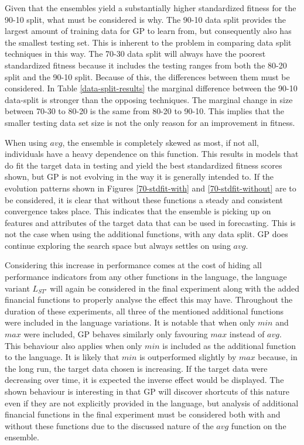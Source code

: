 \documentclass[12pt, letterpaper]{article}
\begin{document}
\textrm{ \indent Given that the ensembles yield a substantially higher standardized fitness for the 90-10 split, what must be considered is why. The 90-10 data split provides the largest amount of training data for GP to learn from, but consequently also has the smallest testing set. This is inherent to the problem in comparing data split techniques in this way. The 70-30 data split will always have the poorest standardized fitness because it includes the testing ranges from both the 80-20 split and the 90-10 split. Because of this, the differences between them must be considered. In Table \ref{data-split-results} the marginal difference between the 90-10 data-split is stronger than the opposing techniques. The marginal change in size between 70-30 to 80-20 is the same from 80-20 to 90-10. This implies that the smaller testing data set size is not the only reason for an improvement in fitness. }

\textrm{ \indent When using $avg$, the ensemble is completely skewed as most, if not all, individuals have a heavy dependence on this function. This results in models that do fit the target data in testing and yield the best standardized fitness scores shown, but GP is not evolving in the way it is generally intended to. If the evolution patterns shown in Figures \ref{70-stdfit-with} and \ref{70-stdfit-without} are to be considered, it is clear that without these functions a steady and consistent convergence takes place. This indicates that the ensemble is picking up on features and attributes of the target data that can be used in forecasting. This is not the case when using the additional functions, with any data split. GP does continue exploring the search space but always settles on using $avg$. }

\textrm{ \indent Considering this increase in performance comes at the cost of hiding all performance indicators from any other functions in the language, the language variant $L_{ST'}$ will again be considered in the final experiment along with the added financial functions to properly analyse the effect this may have. Throughout the duration of these experiments, all three of the mentioned additional functions were included in the language variations. It is notable that when only $min$ and $max$ were included, GP behaves similarly only favouring $max$ instead of $avg$. This behaviour also applies when only $min$ is included as the additional function to the language. It is likely that $min$ is outperformed slightly by $max$ because, in the long run, the target data chosen is increasing. If the target data were decreasing over time, it is expected the inverse effect would be displayed. The shown behaviour is interesting in that GP will discover shortcuts of this nature even if they are not explicitly provided in the language, but analysis of additional financial functions in the final experiment must be considered both with and without these functions due to the discussed nature of the $avg$ function on the ensemble. }
\end{document}
